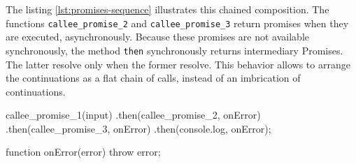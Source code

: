 




The listing \ref{lst:promises-sequence} illustrates this chained composition.
The functions \texttt{callee\_promise\_2} and \texttt{callee\_promise\_3} return promises when they are executed, asynchronously.
Because these promises are not available synchronously, the method \texttt{then} synchronously returns intermediary Promises.
The latter resolve only when the former resolve.
This behavior allows to arrange the continuations as a flat chain of calls, instead of an imbrication of continuations.

\begin{code}[js, %
             caption={Example of a chain of Promises}, %
             label={lst:promises-sequence}] %
callee_promise_1(input)
.then(callee_promise_2, onError)
.then(callee_promise_3, onError)
.then(console.log, onError);

function onError(error) {
  throw error;
}
\end{code}

